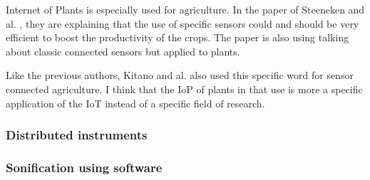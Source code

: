 Internet of Plants is especially used for agriculture. In the paper of Steeneken and al.
\cite{steenekenSensorsAgricultureInternet2023}, they are explaining that the use of specific
sensors could and should be very efficient to boost the productivity of the crops.
The paper is also using talking about classic connected sensors but applied to plants.

Like the previous authors, Kitano and al. \cite{kitanoInternetPlantsIoP2022} also used 
this specific word for sensor connected agriculture. I think that the IoP of plants in 
that use is more a specific application of the IoT instead of a specific field of research.


\subsubsection{Distributed instruments}



\subsubsection{Sonification using software}